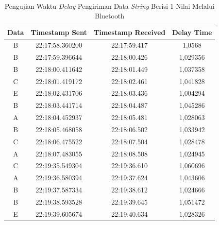 \begin{table}[htpb]
  \centering
  \caption{Pengujian Waktu \emph{Delay} Pengiriman Data \emph{String} Berisi 1 Nilai Melalui Bluetooth}
  \label{tbl:delayBluetooth1}
  \begin{tabular}{|ccc|c|}
  \hline
  \multicolumn{1}{|c|}{Data} & \multicolumn{1}{c|}{Timestamp Sent}  & Timestamp Received & Delay Time  \\ \hline
  \multicolumn{1}{|c|}{B}    & \multicolumn{1}{c|}{22:17:58.360200} & 22:17:59.417       & 1,0568      \\ \hline
  \multicolumn{1}{|c|}{B}    & \multicolumn{1}{c|}{22:17:59.396644} & 22:18:00.426       & 1,029356    \\ \hline
  \multicolumn{1}{|c|}{B}    & \multicolumn{1}{c|}{22:18:00.411642} & 22:18:01.449       & 1,037358    \\ \hline
  \multicolumn{1}{|c|}{C}    & \multicolumn{1}{c|}{22:18:01.419172} & 22:18:02.461       & 1,041828    \\ \hline
  \multicolumn{1}{|c|}{E}    & \multicolumn{1}{c|}{22:18:02.431706} & 22:18:03.436       & 1,004294    \\ \hline
  \multicolumn{1}{|c|}{B}    & \multicolumn{1}{c|}{22:18:03.441714} & 22:18:04.487       & 1,045286    \\ \hline
  \multicolumn{1}{|c|}{A}    & \multicolumn{1}{c|}{22:18:04.452937} & 22:18:05.481       & 1,028063    \\ \hline
  \multicolumn{1}{|c|}{B}    & \multicolumn{1}{c|}{22:18:05.468058} & 22:18:06.502       & 1,033942    \\ \hline
  \multicolumn{1}{|c|}{C}    & \multicolumn{1}{c|}{22:18:06.475522} & 22:18:07.504       & 1,028478    \\ \hline
  \multicolumn{1}{|c|}{A}    & \multicolumn{1}{c|}{22:18:07.483055} & 22:18:08.508       & 1,024945    \\ \hline
  \multicolumn{1}{|c|}{C}    & \multicolumn{1}{c|}{22:19:35.549304} & 22:19:36.610       & 1,060696    \\ \hline
  \multicolumn{1}{|c|}{A}    & \multicolumn{1}{c|}{22:19:36.580394} & 22:19:37.624       & 1,043606    \\ \hline
  \multicolumn{1}{|c|}{B}    & \multicolumn{1}{c|}{22:19:37.587334} & 22:19:38.612       & 1,024666    \\ \hline
  \multicolumn{1}{|c|}{B}    & \multicolumn{1}{c|}{22:19:38.593528} & 22:19:39.645       & 1,051472    \\ \hline
  \multicolumn{1}{|c|}{E}    & \multicolumn{1}{c|}{22:19:39.605674} & 22:19:40.634       & 1,028326    \\ \hline

\end{tabular}
\end{table}

